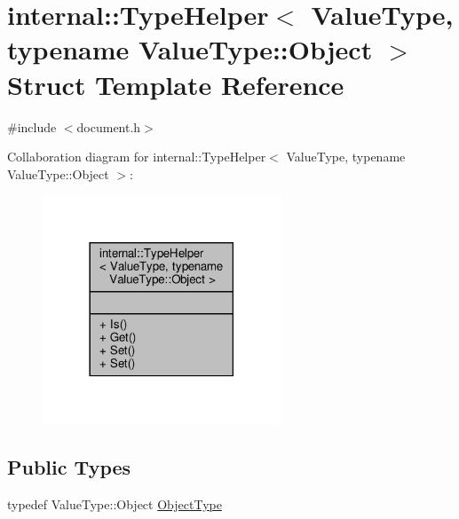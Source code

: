 \hypertarget{structinternal_1_1TypeHelper_3_01ValueType_00_01typename_01ValueType_1_1Object_01_4}{}\section{internal\+:\+:Type\+Helper$<$ Value\+Type, typename Value\+Type\+:\+:Object $>$ Struct Template Reference}
\label{structinternal_1_1TypeHelper_3_01ValueType_00_01typename_01ValueType_1_1Object_01_4}


{\ttfamily \#include $<$document.\+h$>$}



Collaboration diagram for internal\+:\+:Type\+Helper$<$ Value\+Type, typename Value\+Type\+:\+:Object $>$\+:
\nopagebreak
\begin{figure}[H]
\begin{center}
\leavevmode
\includegraphics[width=201pt]{structinternal_1_1TypeHelper_3_01ValueType_00_01typename_01ValueType_1_1Object_01_4__coll__graph}
\end{center}
\end{figure}
\subsection*{Public Types}
\begin{DoxyCompactItemize}
\item 
typedef Value\+Type\+::\+Object \hyperlink{structinternal_1_1TypeHelper_3_01ValueType_00_01typename_01ValueType_1_1Object_01_4_ac5d59bffe76792786fd5f1ba4da94dd9}{Object\+Type}
\end{DoxyCompactItemize}
